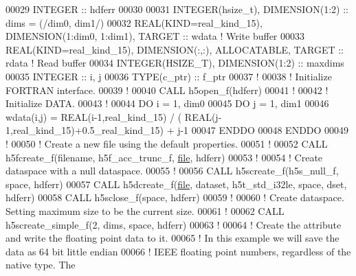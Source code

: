 \begin{DoxyCode}
00029   \textcolor{keywordtype}{INTEGER} :: hdferr
00030 
00031   \textcolor{keywordtype}{INTEGER(hsize\_t)},   \textcolor{keywordtype}{DIMENSION(1:2)} :: dims = (/dim0, dim1/)
00032   \textcolor{keywordtype}{REAL(KIND=real\_kind\_15)}, \textcolor{keywordtype}{DIMENSION(1:dim0, 1:dim1)}, \textcolor{keywordtype}{TARGET} :: wdata \textcolor{comment}{! Write buffer}
00033   \textcolor{keywordtype}{REAL(KIND=real\_kind\_15)}, \textcolor{keywordtype}{DIMENSION(:,:)}, \textcolor{keywordtype}{ALLOCATABLE}, \textcolor{keywordtype}{TARGET} :: rdata \textcolor{comment}{! Read buffer}
00034   \textcolor{keywordtype}{INTEGER(HSIZE\_T)}, \textcolor{keywordtype}{DIMENSION(1:2)} :: maxdims
00035   \textcolor{keywordtype}{INTEGER} :: i, j
00036   \textcolor{keywordtype}{TYPE}(c\_ptr) :: f\_ptr
00037   \textcolor{comment}{!}
00038   \textcolor{comment}{! Initialize FORTRAN interface.}
00039   \textcolor{comment}{!}
00040   \textcolor{keyword}{CALL }h5open\_f(hdferr)
00041   \textcolor{comment}{!}
00042   \textcolor{comment}{! Initialize DATA.}
00043   \textcolor{comment}{!}
00044   \textcolor{keywordflow}{DO} i = 1, dim0
00045      \textcolor{keywordflow}{DO} j = 1, dim1
00046         wdata(i,j) = \textcolor{keywordtype}{REAL(i-1,real\_kind\_15)} / ( \textcolor{keywordtype}{REAL}(j-1,real\_kind\_15)+0.5\_real\_kind\_15) + j-1
00047 \textcolor{keywordflow}{     ENDDO}
00048 \textcolor{keywordflow}{  ENDDO}
00049   \textcolor{comment}{!}
00050   \textcolor{comment}{! Create a new file using the default properties.}
00051   \textcolor{comment}{!}
00052   \textcolor{keyword}{CALL }h5fcreate\_f(filename, h5f\_acc\_trunc\_f, \hyperlink{structfile}{file}, hdferr)
00053   \textcolor{comment}{!}
00054   \textcolor{comment}{! Create dataspace with a null dataspace.}
00055   \textcolor{comment}{!}
00056   \textcolor{keyword}{CALL }h5screate\_f(h5s\_null\_f, space, hdferr)
00057   \textcolor{keyword}{CALL }h5dcreate\_f(\hyperlink{structfile}{file}, dataset, h5t\_std\_i32le, space, dset, hdferr)
00058   \textcolor{keyword}{CALL }h5sclose\_f(space, hdferr)
00059   \textcolor{comment}{!}
00060   \textcolor{comment}{! Create dataspace.  Setting maximum size to be the current size.}
00061   \textcolor{comment}{!}
00062   \textcolor{keyword}{CALL }h5screate\_simple\_f(2, dims, space, hdferr)
00063   \textcolor{comment}{!}
00064   \textcolor{comment}{! Create the attribute and write the floating point data to it.}
00065   \textcolor{comment}{! In this example we will save the data as 64 bit little endian}
00066   \textcolor{comment}{! IEEE floating point numbers, regardless of the native type.  The}

\end{DoxyCode}
